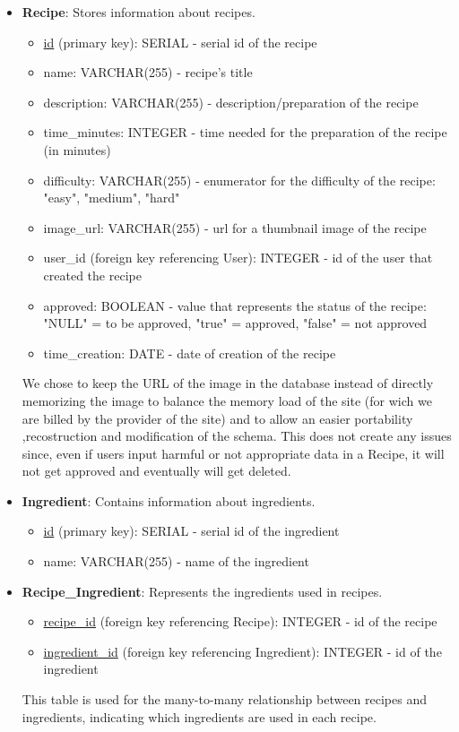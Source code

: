 \begin{itemize}
    \item \textbf{Recipe}: Stores information about recipes.
    \begin{itemize}
        \item \underline{id} (primary key): SERIAL - serial id of the recipe
        \item name: VARCHAR(255) - recipe's title
        \item description: VARCHAR(255) - description/preparation of the recipe
        \item time\_minutes: INTEGER - time needed for the preparation of the recipe (in minutes)
        \item difficulty: VARCHAR(255) - enumerator for the difficulty of the recipe: "easy", "medium", "hard"
        \item image\_url: VARCHAR(255) - url for a thumbnail image of the recipe
        \item user\_id (foreign key referencing User): INTEGER - id of the user that created the recipe
        \item approved: BOOLEAN - value that represents the status of the recipe: "NULL" = to be approved, "true" = approved, "false" = not approved
        \item time\_creation: DATE - date of creation of the recipe
    \end{itemize}
    We chose to keep the URL of the image in the database instead of directly memorizing the image to balance the memory load of the site (for wich we are billed by the provider of the site) and to allow an easier portability ,recostruction and modification of the schema. This does not create any issues since, even if users input harmful or not appropriate data in a Recipe, it will not get approved and eventually will get deleted.


      \item \textbf{Ingredient}: Contains information about ingredients.
    \begin{itemize}
        \item \underline{id} (primary key): SERIAL - serial id of the ingredient
        \item name: VARCHAR(255) - name of the ingredient
    \end{itemize}

        \item \textbf{Recipe\_Ingredient}: Represents the ingredients used in recipes.
    \begin{itemize}
        \item \underline{recipe\_id} (foreign key referencing Recipe): INTEGER - id of the recipe
        \item \underline{ingredient\_id} (foreign key referencing Ingredient): INTEGER - id of the ingredient
    \end{itemize}
    This table is used for the many-to-many relationship between recipes and ingredients, indicating which ingredients are used in each recipe.
    


\end{itemize}
